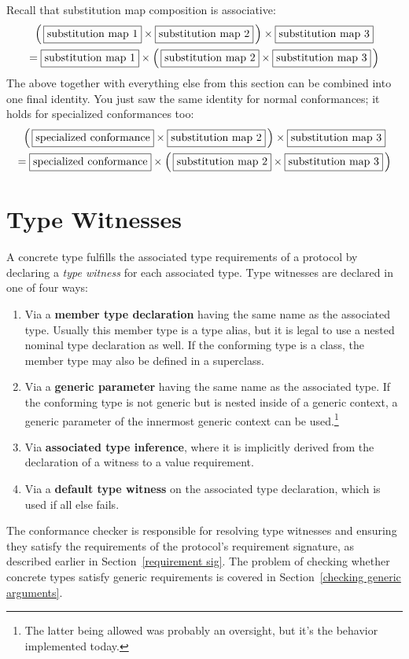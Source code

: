 \documentclass[a4paper,headsepline,bibliography=totoc,toc=flat,fleqn,twoside=semi]{scrbook}
\theoremstyle{definition}
\theoremstyle{definition}
\theoremstyle{definition}
\newcommand{\mathboxed}[1]{\boxed{\mbox{\vphantom{pI\texttt{pI}}#1}}}
\begin{document}
Recall that substitution map composition is associative:
\begin{multline*}
\left(\,\mathboxed{substitution map 1}\times\mathboxed{substitution map 2}\,\right)\times \mathboxed{substitution map 3}\\
=\mathboxed{substitution map 1} \times \left(\,\mathboxed{substitution map 2} \times \mathboxed{substitution map 3}\,\right)
\end{multline*}
The above together with everything else from this section can be combined into one final identity. You just saw the same identity for normal conformances; it holds for specialized conformances too:
\begin{multline*}
\left(\,\mathboxed{specialized conformance} \times \mathboxed{substitution map 2}\,\right) \times \mathboxed{substitution map 3}\\
= \mathboxed{specialized conformance} \times \left(\,\mathboxed{substitution map 2} \times \mathboxed{substitution map 3}\,\right)
\end{multline*}

\section{Type Witnesses}\label{type witnesses}

A concrete type fulfills the associated type requirements of a protocol by declaring a \emph{type witness} for each associated type. Type witnesses are declared in one of four ways:
\begin{enumerate}
\item Via a \textbf{member type declaration} having the same name as the associated type. Usually this member type is a type alias, but it is legal to use a nested nominal type declaration as well. If the conforming type is a class, the member type may also be defined in a superclass.
\item Via a \textbf{generic parameter} having the same name as the associated type. If the conforming type is not generic but is nested inside of a generic context, a generic parameter of the innermost generic context can be used.\footnote{The latter being allowed was probably an oversight, but it's the behavior implemented today.}
\item Via \textbf{associated type inference}, where it is implicitly derived from the declaration of a witness to a value requirement.
\item Via a \textbf{default type witness} on the associated type declaration, which is used if all else fails.
\end{enumerate}
The conformance checker is responsible for resolving type witnesses and ensuring they satisfy the requirements of the protocol's requirement signature, as described earlier in Section~\ref{requirement sig}. The problem of checking whether concrete types satisfy generic requirements is covered in Section~\ref{checking generic arguments}.
\end{document}
